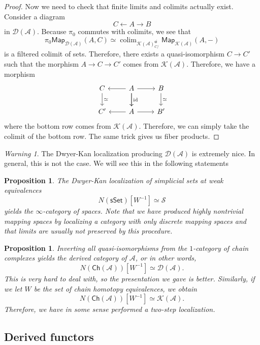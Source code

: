 \documentclass[10pt]{amsart}
\newtheorem{prop}[thm]{Proposition}
\theoremstyle{definition}
\theoremstyle{remark}
\newtheorem{warn}[thm]{Warning}
\theoremstyle{plain}
\theoremstyle{definition}
\theoremstyle{remark}
\newcommand{\mc}[1]{\mathcal{#1}}
\newcommand{\mr}[1]{\mathrm{#1}}
\newcommand{\ms}[1]{\mathsf{#1}}
\newcommand{\1}{\mathbf{1}}
\newcommand{\2}{\mathbf{2}}
\newcommand{\3}{\mathbf{3}}
\DeclareMathOperator*{\colim}{colim}
\begin{document}
\begin{proof}
    Now we need to check that finite limits and colimits actually exist. Consider a diagram
    \[ C \gets A \to B \]
    in $\mc{D}(\mc{A})$. Because $\pi_0$ commutes with colimits, we see that
    \[ \pi_0 \ms{Map}_{\mc{D}(\mc{A})}(A, C) \simeq \colim_{\mc{K}(\mc{A})_{C/}^{\ms{qi}}} \ms{Map}_{\mc{K}(\mc{A})}(A, -) \]
    is a filtered colimit of sets. Therefore, there exists a quasi-isomorphism $C \to C'$ such that the morphism $A \to C \to C'$ comes from $\mc{K}(\mc{A})$. Therefore, we have a morphism
    \begin{equation*}
    \begin{tikzcd}
        C \ar{d}{\simeq} & A \ar{d}{\mr{id}} \ar{l} \ar{r}\ar{d} & B \ar{d}{\simeq} \\
        C' & A \ar{l} \ar{r} & B'
    \end{tikzcd}
    \end{equation*}
    where the bottom row comes from $\mc{K}(\mc{A})$. Therefore, we can simply take the colimit of the bottom row. The same trick gives us fiber products.
\end{proof}

\begin{warn}
    The Dwyer-Kan localization producing $\mc{D}(\mc{A})$ is extremely nice. In general, this is not the case. We will see this in the following statements
\end{warn}

\begin{prop}
    The Dwyer-Kan localization of simplicial sets at weak equivalences
    \[ N(\ms{sSet})[W^{-1}] \simeq \mc{S} \]
    yields the $\infty$-category of spaces. Note that we have produced highly nontrivial mapping spaces by localizing a category with only discrete mapping spaces and that limits are usually not preserved by this procedure.
\end{prop}

\begin{prop}
    Inverting all quasi-isomorphisms from the $1$-category of chain complexes yields the derived category of $\mc{A}$, or in other words,
    \[ N(\ms{Ch}(\mc{A}))[W^{-1}] \simeq \mc{D}(\mc{A}). \]
    This is very hard to deal with, so the presentation we gave is better. Similarly, if we let $W$ be the set of chain homotopy equivalences, we obtain
    \[ N(\ms{Ch}(\mc{A}))[W^{-1}] \simeq \mc{K}(\mc{A}). \]
    Therefore, we have in some sense performed a two-step localization.
\end{prop}


\subsection{Derived functors}%
\label{sub:Derived functors}
\end{document}
